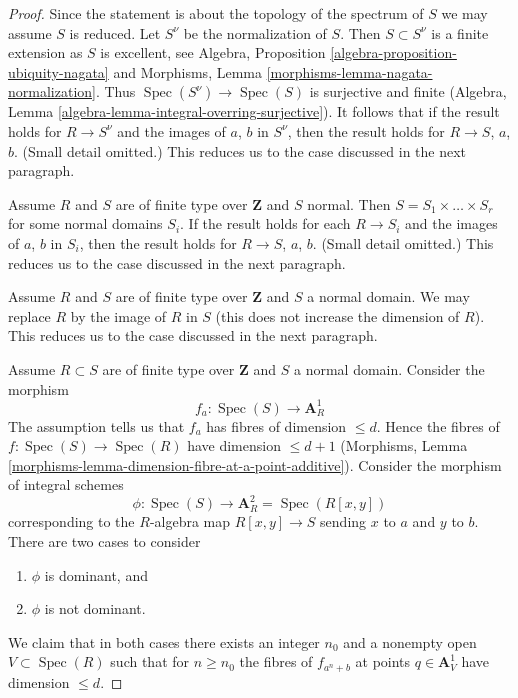 \documentclass[10pt,a4paper]{amsart}
\theoremstyle{plain}
\theoremstyle{definition}
\theoremstyle{remark}
\numberwithin{equation}{subsection}
\def\Spec{\mathop{\mathrm{Spec}}}
\begin{document}
\begin{proof}
\medskip\noindent
Since the statement is about the topology of the spectrum of $S$
we may assume $S$ is reduced. Let $S^\nu$ be the normalization of $S$.
Then $S \subset S^\nu$ is a finite extension as $S$ is excellent, see
Algebra, Proposition \ref{algebra-proposition-ubiquity-nagata}
and Morphisms, Lemma \ref{morphisms-lemma-nagata-normalization}.
Thus $\Spec(S^\nu) \to \Spec(S)$ is surjective and finite
(Algebra, Lemma \ref{algebra-lemma-integral-overring-surjective}).
It follows that if the result holds for $R \to S^\nu$ and the
images of $a$, $b$ in $S^\nu$, then the result holds for $R \to S$, $a$, $b$.
(Small detail omitted.) This reduces us to the case discussed in the
next paragraph.

\medskip\noindent
Assume $R$ and $S$ are of finite type over $\mathbf{Z}$ and
$S$ normal. Then $S = S_1 \times \ldots \times S_r$ for some
normal domains $S_i$. If the result holds for each $R \to S_i$
and the images of $a$, $b$ in $S_i$, then the result holds for
$R \to S$, $a$, $b$. (Small detail omitted.)
This reduces us to the case discussed in the next paragraph.

\medskip\noindent
Assume $R$ and $S$ are of finite type over $\mathbf{Z}$ and
$S$ a normal domain. We may replace $R$ by the image of $R$ in $S$
(this does not increase the dimension of $R$).
This reduces us to the case discussed in the next paragraph.

\medskip\noindent
Assume $R \subset S$ are of finite type over $\mathbf{Z}$ and
$S$ a normal domain. Consider the morphism
$$
f_a : \Spec(S) \to \mathbf{A}^1_R
$$
The assumption tells us that $f_a$ has fibres of dimension $\leq d$.
Hence the fibres of $f : \Spec(S) \to \Spec(R)$ have dimension $\leq d + 1$
(Morphisms, Lemma \ref{morphisms-lemma-dimension-fibre-at-a-point-additive}).
Consider the morphism of integral schemes
$$
\phi : \Spec(S) \to \mathbf{A}^2_R = \Spec(R[x, y])
$$
corresponding to the $R$-algebra map $R[x, y] \to S$ sending $x$ to $a$
and $y$ to $b$. There are two cases to consider
\begin{enumerate}
\item $\phi$ is dominant, and
\item $\phi$ is not dominant.
\end{enumerate}
We claim that in both cases there exists an integer $n_0$
and a nonempty open $V \subset \Spec(R)$ such that for $n \geq n_0$
the fibres of $f_{a^n + b}$ at points $q \in \mathbf{A}^1_V$
have dimension $\leq d$.


\end{proof}
\end{document}
